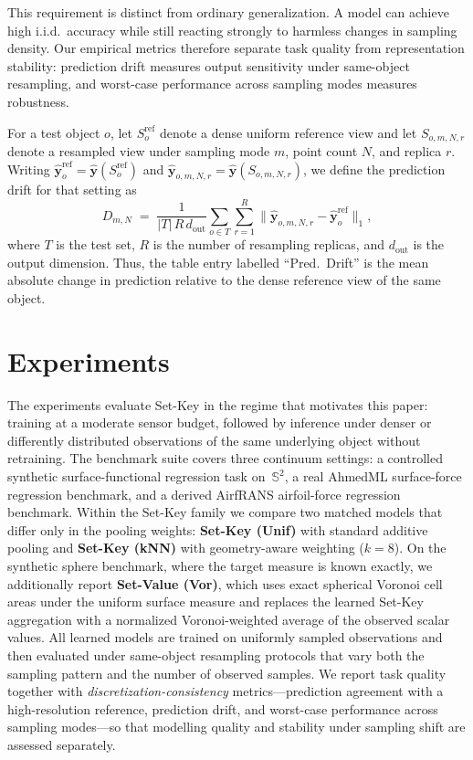 \documentclass[11pt]{article}
\begin{document}
This requirement is distinct from ordinary generalization.  A model can achieve
high i.i.d.\ accuracy while still reacting strongly to harmless changes in
sampling density.  Our empirical metrics therefore separate task quality from
representation stability: prediction drift measures output sensitivity under
same-object resampling, and
worst-case performance across sampling modes measures robustness.

For a test object $o$, let $S_o^{\mathrm{ref}}$ denote a dense uniform
reference view and let $S_{o,m,N,r}$ denote a resampled view under sampling
mode $m$, point count $N$, and replica $r$.  Writing
$\widehat{\boldsymbol{y}}_o^{\mathrm{ref}}=\widehat{\boldsymbol{y}}(S_o^{\mathrm{ref}})$
and
$\widehat{\boldsymbol{y}}_{o,m,N,r}=\widehat{\boldsymbol{y}}(S_{o,m,N,r})$,
we define the prediction drift for that setting as
\[
  D_{m,N}
  \;=\;
  \frac{1}{|T|\,R\,d_{\mathrm{out}}}
  \sum_{o\in T}
  \sum_{r=1}^{R}
  \bigl\|
    \widehat{\boldsymbol{y}}_{o,m,N,r}
    -
    \widehat{\boldsymbol{y}}_o^{\mathrm{ref}}
  \bigr\|_1,
\]
where $T$ is the test set, $R$ is the number of resampling replicas, and
$d_{\mathrm{out}}$ is the output dimension.  Thus, the table entry labelled
``Pred.\ Drift'' is the mean absolute change in prediction relative to the
dense reference view of the same object.

\section{Experiments}
\label{sec:experiments}

The experiments evaluate Set-Key in the regime that motivates this paper:
training at a moderate sensor budget, followed by inference under denser or
differently distributed observations of the same underlying object without
retraining.  The benchmark suite covers three continuum settings: a controlled
synthetic surface-functional regression task on~$\mathbb{S}^2$, a real AhmedML
surface-force regression benchmark, and a derived AirfRANS airfoil-force
regression benchmark.  Within the Set-Key family we compare two matched models
that differ only in the pooling weights: \textbf{Set-Key (Unif)} with standard
additive pooling and \textbf{Set-Key (kNN)} with geometry-aware weighting
($k{=}8$).  On the synthetic sphere benchmark, where the target measure is
known exactly, we additionally report \textbf{Set-Value (Vor)}, which uses exact
spherical Voronoi cell areas under the uniform surface measure and replaces
the learned Set-Key aggregation with a normalized Voronoi-weighted average of
the observed scalar values.  All learned models are trained on uniformly
sampled observations and then evaluated under same-object resampling protocols
that vary both the sampling pattern and the number of observed samples.  We
report task quality together with \emph{discretization-consistency}
metrics---prediction agreement with a high-resolution reference, prediction
drift, and worst-case performance across sampling modes---so that modelling
quality and stability under sampling shift are assessed separately.
\end{document}

